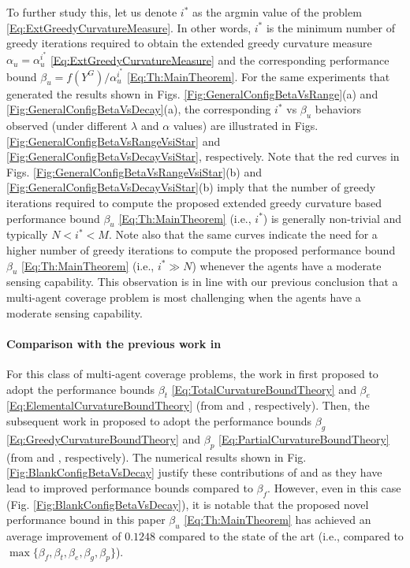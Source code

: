 \documentclass[conference]{IEEEtran}
\begin{document}
To further study this, let us denote $i^*$ as the argmin value of the problem \eqref{Eq:ExtGreedyCurvatureMeasure}. In other words, $i^*$ is the minimum number of greedy iterations required to obtain the extended greedy curvature measure $\alpha_u = \alpha^{i^*}_u$ \eqref{Eq:ExtGreedyCurvatureMeasure} and the corresponding performance bound $\beta_u=f(Y^G)/\alpha^{i^*}_u$ \eqref{Eq:Th:MainTheorem}. For the same experiments that generated the results shown in Figs. \ref{Fig:GeneralConfigBetaVsRange}(a) and \ref{Fig:GeneralConfigBetaVsDecay}(a), the corresponding $i^*$ vs $\beta_u$ behaviors observed (under different $\lambda$ and $\alpha$ values) are illustrated in Figs. \ref{Fig:GeneralConfigBetaVsRangeVsiStar} and  \ref{Fig:GeneralConfigBetaVsDecayVsiStar}, respectively. Note that the red curves in Figs. \ref{Fig:GeneralConfigBetaVsRangeVsiStar}(b) and  \ref{Fig:GeneralConfigBetaVsDecayVsiStar}(b) imply that the number of greedy iterations required to compute the proposed extended greedy curvature based performance bound $\beta_u$ \eqref{Eq:Th:MainTheorem} (i.e., $i^*$) is generally non-trivial and typically $N<i^*<M$.    
Note also that the same curves indicate the need for a higher number of greedy iterations to compute the proposed performance bound $\beta_u$ \eqref{Eq:Th:MainTheorem} (i.e., $i^*\gg N$) whenever the agents have a moderate sensing capability. This observation is in line with our previous conclusion that a multi-agent coverage problem is most challenging when the agents have a moderate sensing capability. 



\paragraph*{\textbf{Comparison with the previous work in} \cite{Sun2019,Sun2020}}
For this class of multi-agent coverage problems, the work in \cite{Sun2019} first proposed to adopt the performance bounds $\beta_t$ \eqref{Eq:TotalCurvatureBoundTheory} and $\beta_e$ \eqref{Eq:ElementalCurvatureBoundTheory} (from \cite{Conforti1984} and \cite{Wang2016}, respectively). Then, the subsequent work in \cite{Sun2020} proposed to adopt the performance bounds $\beta_g$ \eqref{Eq:GreedyCurvatureBoundTheory} and $\beta_p$ \eqref{Eq:PartialCurvatureBoundTheory} (from \cite{Conforti1984} and \cite{Liu2018}, respectively). The numerical results shown in Fig. \ref{Fig:BlankConfigBetaVsDecay} justify these contributions of \cite{Sun2019} and \cite{Sun2020} as they have lead to improved performance bounds compared to $\beta_f$. However, even in this case (Fig. \ref{Fig:BlankConfigBetaVsDecay}), it is notable that the proposed novel performance bound in this paper $\beta_u$ \eqref{Eq:Th:MainTheorem} has achieved an average improvement of $0.1248$ compared to the state of the art (i.e., compared to  $\max\{\beta_f,\beta_t,\beta_e,\beta_g,\beta_p\}$).
\end{document}
